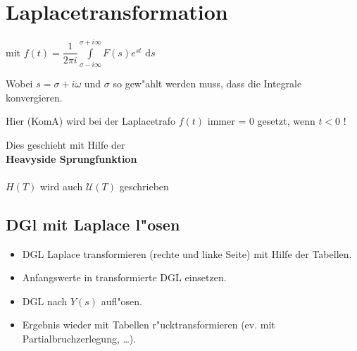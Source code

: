 
\section{Laplacetransformation}
mit \( \displaystyle f(t) = \dfrac{1}{2\pi i} \int\limits_{\sigma-i\infty}^{\sigma+i\infty} F(s)e^{st} \text{ d}s \)

Wobei \( s = \sigma + i\omega \) und \( \sigma \) so gew"ahlt werden muss, dass die Integrale konvergieren.

Hier (KomA) wird bei der Laplacetrafo \( f(t) \) immer = 0 gesetzt, wenn \( t<0 \) !

Dies geschieht mit Hilfe der\\
\textbf{Heavyside Sprungfunktion}\\
\\
$H(T)$ wird auch $\mathcal{U}(T)$ geschrieben

\subsection{DGl mit Laplace l"osen}
\begin{itemize}
\item	DGL Laplace transformieren (rechte und linke Seite) mit Hilfe der Tabellen.
\item	Anfangswerte in transformierte DGL einsetzen.
\item	DGL nach \(Y(s)\) aufl"osen.
\item	Ergebnis wieder mit Tabellen r"ucktransformieren (ev. mit Partialbruchzerlegung, \dots).
\end{itemize}

